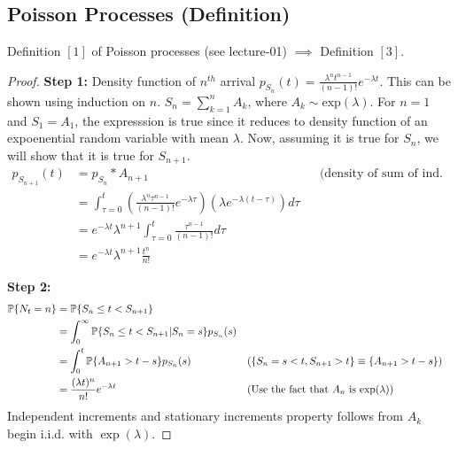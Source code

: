 \documentclass[all-lectures.tex]{subfiles}
\begin{document}
\setcounter{chapter}{1}
\setcounter{section}{2}

\section*{}
\setcounter{subsection}{0}
\subsection{Poisson Processes (Definition)}
\begin{prop}[]
Definition $[1]$ of Poisson processes (see lecture-01) $\implies$ Definition $[3]$.
\begin{proof} 
\textbf{Step 1:} Density function of $n^{th}$ arrival $p_{S_n}(t) = \frac{\lambda^n t^{n-1}}{(n-1)!} e^{-\lambda t}$. This can be shown using induction on $n$. $S_n = \sum_{k=1}^n A_k$, where $A_k \sim \mathrm{exp}(\lambda)$. For $n=1$ and $S_1 = A_1$, the expresssion is true since it reduces to density function of an expoenential random variable with mean $\lambda$. Now, assuming it is true for $S_n$, we will show that it is true for $S_{n+1}$.
\begin{align*}
p_{S_{n+1}}(t) &= p_{S_n} * A_{n+1} && \text{(density of sum of ind. r.v.s is their convolution)} \\
&= \int_{\tau = 0}^{t} \left(\frac{\lambda^n \tau^{n-1}}{(n-1)!} e^{-\lambda \tau} \right) \left( \lambda e^{ - \lambda (t-\tau)} \right) d\tau \\
&=  e^{-\lambda t} \lambda^{n+1}  \int_{\tau = 0}^{t} \frac{\tau^{n-1}}{(n-1)!} d\tau \\
&=  e^{-\lambda t} \lambda^{n+1}  \frac{t^n}{n!}
\end{align*}

\textbf{Step 2:} 
\begin{align*}
\P\{N_t = n\} &= \P\{S_n \leq t < S_{n+1} \} \\
 &= \int_0^\infty \P\{S_n \leq t < S_{n+1} |S_n = s\} p_{S_n}(s) \\
 &= \int_0^t \P\{A_{n+1} > t-s\} p_{S_n}(s) &&\text{($\{S_n =  s<t, S_{n+1} > t\} \equiv \{A_{n+1} > t-s\}$)}\\
 &= 	\frac{(\lambda t)^n}{n!} e^{-\lambda t} &&\text{(Use the fact  that $A_n$ is $\mathrm{exp}(\lambda$))} \qedhere
\end{align*}
Independent increments and stationary increments property follows from $A_k$ begin i.i.d. with $\exp(\lambda)$.
\end{proof}
\end{prop}
\end{document}
